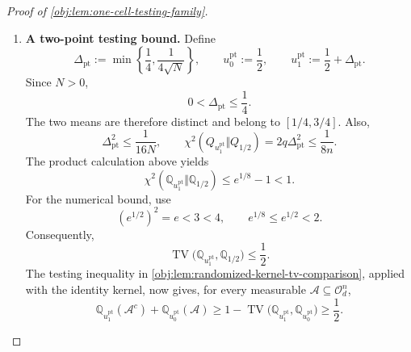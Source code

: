 \documentclass[11pt]{article}
\begin{document}
\begin{proof}[Proof of \cref{obj:lem:one-cell-testing-family}]
\begin{enumerate}
To record the product calculation, define
\[
\ell_u(o):=
\begin{cases}
Q_u(\{o\})/Q_{1/2}(\{o\}),&Q_{1/2}(\{o\})>0,\\
0,&Q_{1/2}(\{o\})=0,
\end{cases}
\qquad
L_{u,n}(\boldsymbol o):=\prod_{i=1}^{n}\ell_u(o_i)
\quad(\boldsymbol o\in\mathcal O_d^n).
\]
These are likelihood ratios almost surely under the corresponding reference laws. Independence gives
\[
E_{\mathbb Q_{1/2}}L_{u,n}=1,
\qquad
E_{\mathbb Q_{1/2}}L_{u,n}^2
=
\left(E_{Q_{1/2}}\ell_u^2\right)^n.
\]
Defining the sample chi-square divergence by
\[
\chi^2(\mathbb Q_u\Vert\mathbb Q_{1/2})
:=
E_{\mathbb Q_{1/2}}(L_{u,n}-1)^2,
\]
we obtain
\[
1+\chi^2(\mathbb Q_u\Vert\mathbb Q_{1/2})
=
\left(1+\chi^2(Q_u\Vert Q_{1/2})\right)^n
\le
\exp\!\left(n\chi^2(Q_u\Vert Q_{1/2})\right).
\]
The final inequality follows from \(1+x\le e^x\) for \(x\ge0\). With the total-variation convention of
\cref{obj:lem:randomized-kernel-tv-comparison}, the finite-space formula and Cauchy--Schwarz give
\[
\operatorname{TV}(\mathbb Q_u,\mathbb Q_{1/2})
=
\frac12E_{\mathbb Q_{1/2}}|L_{u,n}-1|
\le
\frac12
\sqrt{\chi^2(\mathbb Q_u\Vert\mathbb Q_{1/2})}.
\]

\item \textbf{A two-point testing bound.}
Define
\[
\Delta_{\mathrm{pt}}
:=
\min\left\{\frac14,\frac1{4\sqrt N}\right\},
\qquad
u_0^{\mathrm{pt}}:=\frac12,
\qquad
u_1^{\mathrm{pt}}:=\frac12+\Delta_{\mathrm{pt}}.
\]
Since \(N>0\),
\[
0<\Delta_{\mathrm{pt}}\le\frac14.
\]
The two means are therefore distinct and belong to \([1/4,3/4]\). Also,
\[
\Delta_{\mathrm{pt}}^2\le\frac1{16N},
\qquad
\chi^2(Q_{u_1^{\mathrm{pt}}}\Vert Q_{1/2})
=
2q\Delta_{\mathrm{pt}}^2
\le\frac1{8n}.
\]
The product calculation above yields
\[
\chi^2(\mathbb Q_{u_1^{\mathrm{pt}}}\Vert\mathbb Q_{1/2})
\le e^{1/8}-1<1.
\]
For the numerical bound, use
\[
(e^{1/2})^2=e<3<4,
\qquad
e^{1/8}\le e^{1/2}<2.
\]
Consequently,
\[
\operatorname{TV}
 \bigl(\mathbb Q_{u_1^{\mathrm{pt}}},\mathbb Q_{1/2}\bigr)
\le\frac12.
\]
The testing inequality in
\cref{obj:lem:randomized-kernel-tv-comparison}, applied with the identity kernel, now gives, for every measurable
\(\mathscr A\subseteq\mathcal O_d^n\),
\[
\mathbb Q_{u_1^{\mathrm{pt}}}(\mathscr A^c)
+\mathbb Q_{u_0^{\mathrm{pt}}}(\mathscr A)
\ge
1-\operatorname{TV}
 \bigl(\mathbb Q_{u_1^{\mathrm{pt}}},
       \mathbb Q_{u_0^{\mathrm{pt}}}\bigr)
\ge\frac12.
\]


\end{enumerate}
\end{proof}
\end{document}
